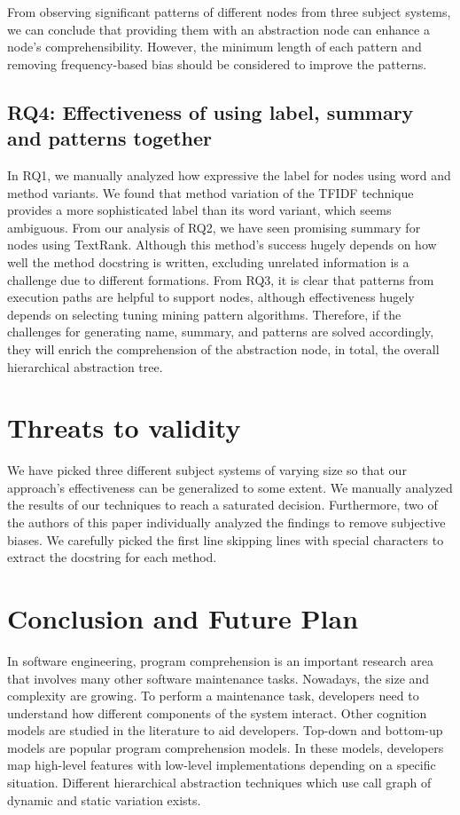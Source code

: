 From observing significant patterns of different nodes from three subject systems, we can conclude that providing them with an abstraction node can enhance a node's comprehensibility. However, the minimum length of each pattern and removing frequency-based bias should be considered to improve the patterns.
\subsection{ RQ4: Effectiveness of using label, summary and patterns together}

In RQ1, we manually analyzed how expressive the label for nodes using word and method variants. We found that method variation of the TFIDF technique provides a more sophisticated label than its word variant, which seems ambiguous. From our analysis of RQ2, we have seen promising summary for nodes using TextRank. Although this method's success hugely depends on how well the method docstring is written, excluding unrelated information is a challenge due to different formations. From RQ3, it is clear that patterns from execution paths are helpful to support nodes, although effectiveness hugely depends on selecting tuning mining pattern algorithms. Therefore, if the challenges for generating name, summary, and patterns are solved accordingly, they will enrich the comprehension of the abstraction node, in total, the overall hierarchical abstraction tree. 

\section{Threats to validity}

We have picked three different subject systems of varying size so that our approach's effectiveness can be generalized to some extent. We manually analyzed the results of our techniques to reach a saturated decision. Furthermore, two of the authors of this paper individually analyzed the findings to remove subjective biases. We carefully picked the first line skipping lines with special characters to extract the docstring for each method. 

\section{Conclusion and Future Plan}
In software engineering, program comprehension is an important research area that involves many other software maintenance tasks. Nowadays, the size and complexity are growing. To perform a maintenance task, developers need to understand how different components of the system interact. Other cognition models are studied in the literature to aid developers. Top-down and bottom-up models are popular program comprehension models. In these models, developers map high-level features with low-level implementations depending on a specific situation. Different hierarchical abstraction techniques which use call graph of dynamic and static variation exists. 

